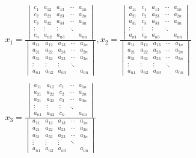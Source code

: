 \documentclass[oneside]{book}
\numberwithin{equation}{chapter} %
\begin{document}
\begin{align*}
	&x_1=\frac{\begin{vmatrix}
			c_1&a_{12}&a_{13}&\cdots&a_{1n}\\c_2&a_{22}&a_{23}&\cdots&a_{2n}\\c_3&a_{32}&a_{33}&\cdots&a_{3n}\\\vdots&\vdots&\vdots&\ddots&\\c_n&a_{n2}&a_{n3}&&a_{nn}
	\end{vmatrix}}{\begin{vmatrix}
	a_{11}&a_{12}&a_{13}&\cdots&a_{1n}\\a_{21}&a_{22}&a_{23}&\cdots&a_{2n}\\a_{31}&a_{32}&a_{33}&\cdots&a_{3n}\\\vdots&\vdots&\vdots&\ddots&\\a_{n1}&a_{n2}&a_{n3}&&a_{nn}
\end{vmatrix}},x_2=\frac{\begin{vmatrix}
			a_{11}&c_1&a_{13}&\cdots&a_{1n}\\a_{21}&c_2&a_{23}&\cdots&a_{2n}\\a_{31}&c_3&a_{33}&\cdots&a_{3n}\\\vdots&\vdots&\vdots&\ddots&\\a_{n1}&c_n&a_{n3}&&a_{nn}
	\end{vmatrix}}{\begin{vmatrix}
			a_{11}&a_{12}&a_{13}&\cdots&a_{1n}\\a_{21}&a_{22}&a_{23}&\cdots&a_{2n}\\a_{31}&a_{32}&a_{33}&\cdots&a_{3n}\\\vdots&\vdots&\vdots&\ddots&\\a_{n1}&a_{n2}&a_{n3}&&a_{nn}
	\end{vmatrix}}\\\\
	&x_3=\frac{\begin{vmatrix}
		a_{11}&a_{12}&c_1&\cdots&a_{1n}\\a_{21}&a_{22}&c_2&\cdots&a_{2n}\\a_{31}&a_{32}&c_3&\cdots&a_{3n}\\\vdots&\vdots&\vdots&\ddots&\\a_{n1}&a_{n2}&c_n&&a_{nn}
\end{vmatrix}}{\begin{vmatrix}
		a_{11}&a_{12}&a_{13}&\cdots&a_{1n}\\a_{21}&a_{22}&a_{23}&\cdots&a_{2n}\\a_{31}&a_{32}&a_{33}&\cdots&a_{3n}\\\vdots&\vdots&\vdots&\ddots&\\a_{n1}&a_{n2}&a_{n3}&&a_{nn}

\end{vmatrix}}
\end{align*}
\end{document}
